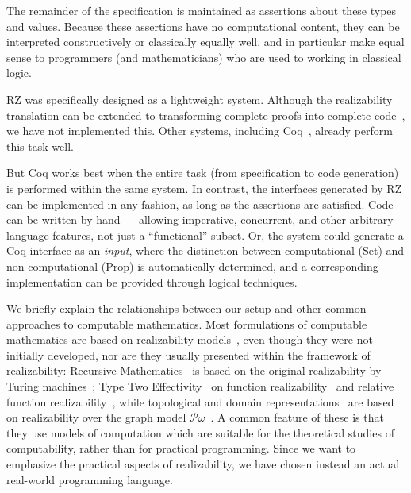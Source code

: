 The remainder of the specification is maintained as assertions about
these types and values. Because these assertions have no computational
content, they can be interpreted constructively or classically equally
well, and in particular make equal sense to programmers (and
mathematicians) who are used to working in classical logic.

\bigskip

RZ was specifically designed as a lightweight system. Although the
realizability translation can be extended to transforming complete
proofs into complete code~\cite{komagata+:tr95}, we have not
implemented this. Other systems, including Coq~\cite{coq}, already
perform this task well.

But Coq works best when the entire task (from specification to code
generation) is performed within the same system. In contrast, the
interfaces generated by RZ can be implemented in any fashion, as long
as the assertions are satisfied. Code can be written by hand ---
allowing imperative, concurrent, and other arbitrary language
features, not just a ``functional'' subset. Or, the system could
generate a Coq interface as an \emph{input}, where the distinction
between computational (Set) and non-computational (Prop) is
automatically determined, and a corresponding implementation can be
provided through logical techniques.


We briefly explain the relationships between our setup and other
common approaches to computable mathematics. Most formulations of
computable mathematics are based on realizability
models~\cite{Bauer:00}, even though they were not initially developed,
nor are they usually presented within the framework of realizability:
Recursive Mathematics~\cite{ershov98:_handb_recur_mathem} is based on
the original realizability by Turing machines~\cite{KleeneSC:intint};
Type Two Effectivity~\cite{Wei00} on function
realizability~\cite{KleeneSC:fouim} and relative function
realizability~\cite{BirkedalL:devttc}, while topological and domain
representations~\cite{Bla97a,Bauer:Birkedal:Scott:98} are based on
realizability over the graph model
$\mathcal{P}\omega$~\cite{ScottD:dattl}. A common feature of these is
that they use models of computation which are suitable for the
theoretical studies of computability, rather than for practical
programming. Since we want to emphasize the practical aspects of
realizability, we have chosen instead an actual real-world programming
language.

